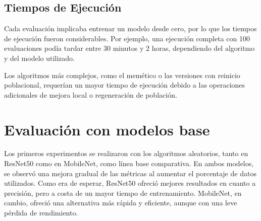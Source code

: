 \subsection{Tiempos de Ejecución}\label{sec:tiempos-de-ejecucion}
Cada evaluación implicaba entrenar un modelo desde cero, por lo que los tiempos de ejecución fueron considerables.
Por ejemplo, una ejecución completa con 100 evaluaciones podía tardar entre 30 minutos y 2 horas,
dependiendo del algoritmo y del modelo utilizado.

Los algoritmos más complejos, como el memético o las versiones con reinicio poblacional,
requerían un mayor tiempo de ejecución debido a las operaciones adicionales de mejora local o regeneración de población.


\section{Evaluación con modelos base}\label{sec:evaluacion-con-modelos-base}
Los primeros experimentos se realizaron con los algoritmos aleatorios, tanto en ResNet50 como en MobileNet, como línea base comparativa.
En ambos modelos, se observó una mejora gradual de las métricas al aumentar el porcentaje de datos utilizados.
Como era de esperar, ResNet50 ofreció mejores resultados en cuanto a precisión, pero a costa de un mayor tiempo de entrenamiento.
MobileNet, en cambio, ofreció una alternativa más rápida y eficiente, aunque con una leve pérdida de rendimiento.

